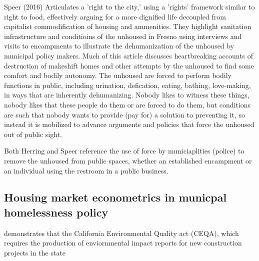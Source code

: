 Speer (2016) Articulates a 'right to the city,' using a 'rights'
framework similar to right to food, effectively arguing for a more
dignified life decoupled from capitalist commodification of housing
and ammenities. They highlight sanitation infrastructure and
conditioins of the unhoused in Fresno using interviews and visits to
encampments to illustrate the dehumanization of the unhoused by
municipal policy makers. Much of this article discusses heartbreaking
accounts of destruction of makeshift homes and other attempts by the
unhoused to find some comfort and bodily autonomy. The unhoused are
forced to perform bodily functions in public, including urination,
defication, eating, bathing, love-making, in ways that are inherently
dehumanizing. Nobody likes to witness these things, nobody likes that
these people do them or are forced to do them, but conditions are such
that nobody wants to provide (pay for) a solution to preventing it, so
instead it is mobilized to advance arguments and policies that force
the unhoused out of public sight.

Both Herring and Speer reference the use of force by municiaplities
(police) to remove the unhoused from public spaces, whether an
established encampment or an individual using the restroom in a public
business.

\subsection{Housing market econometrics in municpal homelessness policy}

\cite{dewitt2022TwistedFate} demonstrates that the California
Environmental Quality act (CEQA), which requires the production of
enviornmental impact reports for new construction projects in the
state
